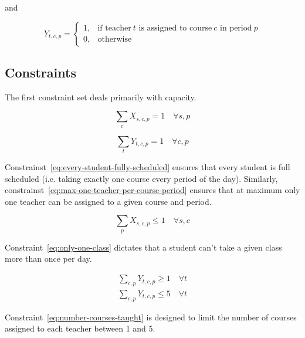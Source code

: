 \documentclass[12pt]{article}
\begin{document}
and

\begin{equation}
	Y_{t,c,p} = 
	\begin{cases}
		1, & \text{if teacher}\ t \text{ is assigned to course}\ c \text{ in period}\ p	\\
		0, & \text{otherwise}
	\end{cases}
\end{equation}

\subsection{Constraints}

The first constraint set deals primarily with capacity.

\begin{equation} \label{eq:every-student-fully-scheduled}
	\displaystyle \sum_{c} X_{s,c,p} = 1 \quad \forall s,p
\end{equation}

\begin{equation} \label{eq:max-one-teacher-per-course-period}
	\displaystyle \sum_{t} Y_{t,c,p} = 1 \quad \forall c,p
\end{equation}

Constrainst~\ref{eq:every-student-fully-scheduled} ensures that every student is full scheduled (i.e. taking exactly one course every period of the day). Similarly, constrainst~\ref{eq:max-one-teacher-per-course-period} ensures that at maximum only one teacher can be assigned to a given course and period.

\begin{equation} \label{eq:only-one-class}
	\displaystyle \sum_{p} X_{s,c,p} \leq 1 \quad \forall s,c
\end{equation}

Constraint~\ref{eq:only-one-class} dictates that a student can't take a given class more than once per day.

\begin{equation} \label{eq:number-courses-taught}
\begin{split}
	\displaystyle \sum_{c,p} Y_{t,c,p} \geq 1 \quad \forall t \\
	\displaystyle \sum_{c,p} Y_{t,c,p} \leq 5 \quad \forall t
\end{split}
\end{equation}

Constraint~\ref{eq:number-courses-taught} is designed to limit the number of courses assigned to each teacher between 1 and 5.
\end{document}
